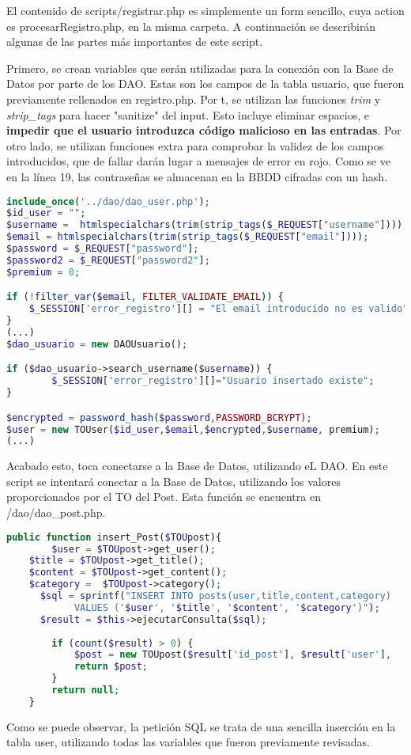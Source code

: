 \documentclass[12pt]{report}
\begin{document}
El contenido de scripts/registrar.php es simplemente un form sencillo, cuya action es procesarRegistro.php, en la misma carpeta. A continuación se describirán algunas de las partes más importantes de este script.

Primero, se crean variables que serán utilizadas para la conexión con la Base de Datos por parte de los DAO. Estas son los campos de la tabla usuario, que fueron previamente rellenados en registro.php. Por t, se utilizan las funciones \textit{trim} y \textit{strip\_tags} para hacer "sanitize" del input. Esto incluye eliminar espacios, e \textbf{impedir que el usuario introduzca código malicioso en las entradas}. Por otro lado, se utilizan funciones extra para comprobar la validez de los campos introducidos, que de fallar darán lugar a mensajes de error en rojo. Como se ve en la línea 19, las contraseñas se almacenan en la BBDD cifradas con un hash.
\newline
\begin{lstlisting}[language=PHP]
include_once('../dao/dao_user.php');
$id_user = "";
$username =  htmlspecialchars(trim(strip_tags($_REQUEST["username"])));
$email = htmlspecialchars(trim(strip_tags($_REQUEST["email"])));
$password = $_REQUEST["password"];
$password2 = $_REQUEST["password2"];
$premium = 0;

if (!filter_var($email, FILTER_VALIDATE_EMAIL)) {  
    $_SESSION['error_registro'][] = "El email introducido no es valido";
}
(...)
$dao_usuario = new DAOUsuario();

if ($dao_usuario->search_username($username)) { 
        $_SESSION['error_registro'][]="Usuario insertado existe";
}

$encrypted = password_hash($password,PASSWORD_BCRYPT); 
$user = new TOUser($id_user,$email,$encrypted,$username, premium);
(...)
\end{lstlisting}

Acabado esto, toca conectarse a la Base de Datos, utilizando eL DAO. En este script se intentará conectar a la Base de Datos, utilizando los valores proporcionados por el TO del Post. Esta función se encuentra en /dao/dao\_post.php.
\newline
\begin{lstlisting}[language=PHP]
public function insert_Post($TOUpost){
		$user = $TOUpost->get_user();
    $title = $TOUpost->get_title();
    $content = $TOUpost->get_content();
    $category =  $TOUpost->category();
	  $sql = sprintf("INSERT INTO posts(user,title,content,category) 
		    VALUES ('$user', '$title', '$content', '$category')");
	  $result = $this->ejecutarConsulta($sql);
		
		if (count($result) > 0) {
			$post = new TOUpost($result['id_post'], $result['user'],   $result['title'], $result['content'], $result['id_cat']);			
			return $post;
		}
		return null;
	}
\end{lstlisting}
Como se puede observar, la petición SQL se trata de una sencilla inserción en la tabla user, utilizando todas las variables que fueron previamente revisadas.
\end{document}
